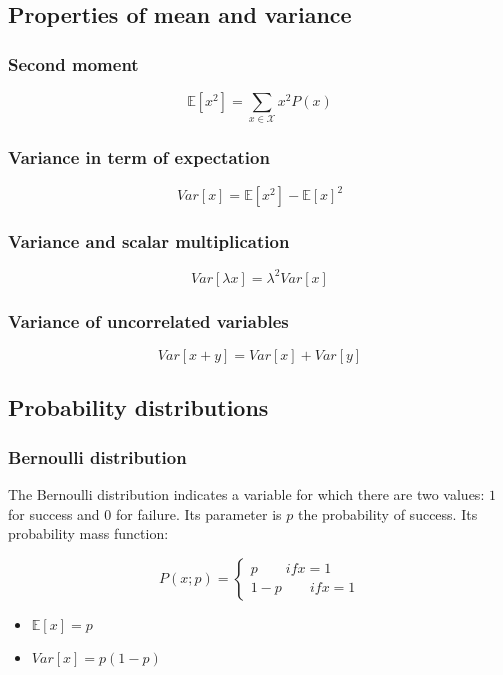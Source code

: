 	\subsection{Properties of mean and variance}

		\subsubsection{Second moment}

		$$\mathbb{E}[x^2] = \sum\limits_{x\in\mathcal{X}}x^2P(x)$$

		\subsubsection{Variance in term of expectation}

		$$Var[x] = \mathbb{E}[x^2] - \mathbb{E}[x]^2$$

		\subsubsection{Variance and scalar multiplication}

		$$Var[\lambda x] = \lambda^2Var[x]$$

		\subsubsection{Variance of uncorrelated variables}

		$$Var[x+y] = Var[x] + Var[y]$$

	\subsection{Probability distributions}

		\subsubsection{Bernoulli distribution}
		The Bernoulli distribution indicates a variable for which there are two values: $1$ for success and $0$ for failure.
		Its parameter is $p$ the probability of success.
		Its probability mass function:

		$$P(x;p) = \begin{cases} p\qquad if x = 1\\ 1-p \qquad if x = 1\end{cases}$$

		\begin{multicols}{2}
			\begin{itemize}
				\item $\mathbb{E}[x] = p$
				\item $Var[x] = p(1-p)$
			\end{itemize}
		\end{multicols}

